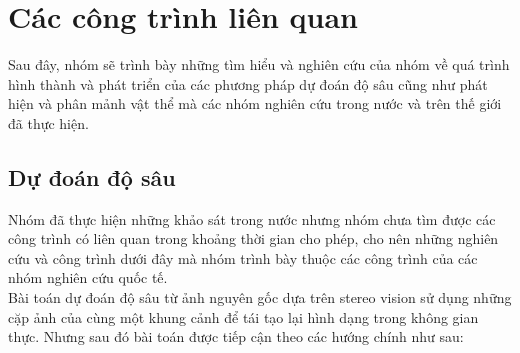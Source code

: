 \chapter{Các công trình liên quan}

Sau đây, nhóm sẽ trình bày những tìm hiểu và nghiên cứu của nhóm về quá trình hình thành và phát triển của các phương pháp dự đoán độ sâu cũng như phát hiện và phân mảnh vật thể mà các nhóm nghiên cứu trong nước và trên thế giới đã thực hiện.


\section{Dự đoán độ sâu}
Nhóm đã thực hiện những khảo sát trong nước nhưng nhóm chưa tìm được các công trình có liên quan trong khoảng thời gian cho phép, cho nên những nghiên cứu và công trình dưới đây mà nhóm trình bày thuộc các công trình của các nhóm nghiên cứu quốc tế.\\

Bài toán dự đoán độ sâu từ ảnh nguyên gốc dựa trên stereo vision \cite{sinz2004learning,memisevic2011stereopsis} sử dụng những cặp ảnh của cùng một khung cảnh để tái tạo lại hình dạng trong không gian thực. Nhưng sau đó bài toán được tiếp cận theo các hướng chính như sau:
